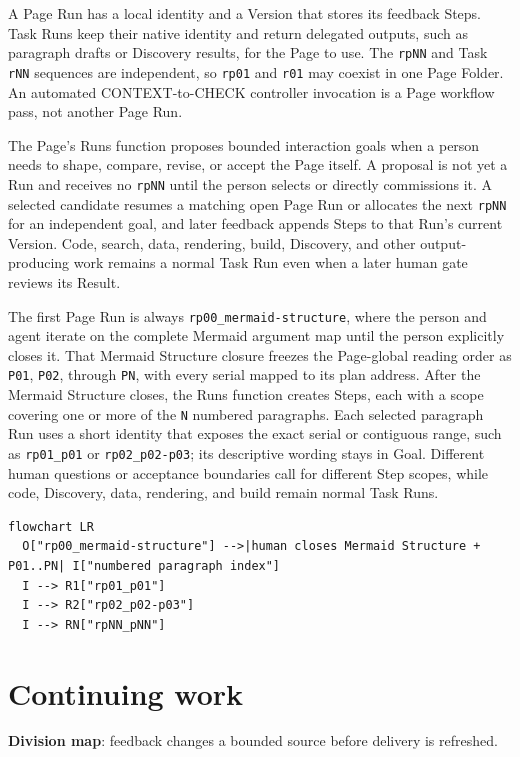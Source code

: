 A Page Run has a local identity and a Version that stores its feedback Steps. Task Runs keep their native identity and return delegated outputs, such as paragraph drafts or Discovery results, for the Page to use. The \texttt{rpNN} and Task \texttt{rNN} sequences are independent, so \texttt{rp01} and \texttt{r01} may coexist in one Page Folder. An automated CONTEXT-to-CHECK controller invocation is a Page workflow pass, not another Page Run.

The Page's Runs function proposes bounded interaction goals when a person needs to shape, compare, revise, or accept the Page itself. A proposal is not yet a Run and receives no \texttt{rpNN} until the person selects or directly commissions it. A selected candidate resumes a matching open Page Run or allocates the next \texttt{rpNN} for an independent goal, and later feedback appends Steps to that Run's current Version. Code, search, data, rendering, build, Discovery, and other output-producing work remains a normal Task Run even when a later human gate reviews its Result.

The first Page Run is always \texttt{rp00\_mermaid-structure}, where the person and agent iterate on the complete Mermaid argument map until the person explicitly closes it. That Mermaid Structure closure freezes the Page-global reading order as \texttt{P01}, \texttt{P02}, through \texttt{PN}, with every serial mapped to its plan address. After the Mermaid Structure closes, the Runs function creates Steps, each with a scope covering one or more of the \texttt{N} numbered paragraphs. Each selected paragraph Run uses a short identity that exposes the exact serial or contiguous range, such as \texttt{rp01\_p01} or \texttt{rp02\_p02-p03}; its descriptive wording stays in Goal. Different human questions or acceptance boundaries call for different Step scopes, while code, Discovery, data, rendering, and build remain normal Task Runs.

\begin{verbatim}
flowchart LR
  O["rp00_mermaid-structure"] -->|human closes Mermaid Structure + P01..PN| I["numbered paragraph index"]
  I --> R1["rp01_p01"]
  I --> R2["rp02_p02-p03"]
  I --> RN["rpNN_pNN"]
\end{verbatim}

\section{Continuing work}
\textbf{Division map}: feedback changes a bounded source before delivery is refreshed.

